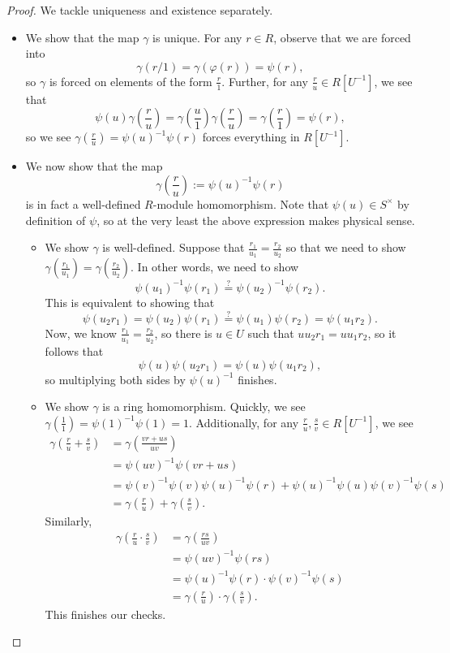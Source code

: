 \begin{proof}
	We tackle uniqueness and existence separately.
	\begin{itemize}
		\item We show that the map $\gamma$ is unique. For any $r\in R$, observe that we are forced into
		\[\gamma(r/1)=\gamma(\varphi(r))=\psi(r),\]
		so $\gamma$ is forced on elements of the form $\frac r1$. Further, for any $\frac ru\in R\left[U^{-1}\right]$, we see that
		\[\psi(u)\gamma\left(\frac ru\right)=\gamma\left(\frac u1\right)\gamma\left(\frac ru\right)=\gamma\left(\frac r1\right)=\psi(r),\]
		so we see $\gamma\left(\frac ru\right)=\psi(u)^{-1}\psi(r)$ forces everything in $R\left[U^{-1}\right]$.
		\item We now show that the map
		\[\gamma\left(\frac ru\right):=\psi(u)^{-1}\psi(r)\]
		is in fact a well-defined $R$-module homomorphism. Note that $\psi(u)\in S^\times$ by definition of $\psi$, so at the very least the above expression makes physical sense.
		\begin{itemize}
			\item We show $\gamma$ is well-defined. Suppose that $\frac{r_1}{u_1}=\frac{r_2}{u_2}$ so that we need to show $\gamma\left(\frac{r_1}{u_1}\right)=\gamma\left(\frac{r_2}{u_2}\right)$. In other words, we need to show
			\[\psi(u_1)^{-1}\psi(r_1)\stackrel?=\psi(u_2)^{-1}\psi(r_2).\]
			This is equivalent to showing that
			\[\psi(u_2r_1)=\psi(u_2)\psi(r_1)\stackrel?=\psi(u_1)\psi(r_2)=\psi(u_1r_2).\]
			Now, we know $\frac{r_1}{u_1}=\frac{r_2}{u_2}$, so there is $u\in U$ such that $uu_2r_1=uu_1r_2$, so it follows that
			\[\psi(u)\psi(u_2r_1)=\psi(u)\psi(u_1r_2),\]
			so multiplying both sides by $\psi(u)^{-1}$ finishes.
			\item We show $\gamma$ is a ring homomorphism. Quickly, we see $\gamma\left(\frac11\right)=\psi(1)^{-1}\psi(1)=1$. Additionally, for any $\frac ru,\frac sv\in R\left[U^{-1}\right]$, we see
			\begin{align*}
				\gamma\left(\frac ru+\frac sv\right) &= \gamma\left(\frac{vr+us}{uv}\right) \\
				&= \psi(uv)^{-1}\psi(vr+us) \\
				&= \psi(v)^{-1}\psi(v)\psi(u)^{-1}\psi(r)+\psi(u)^{-1}\psi(u)\psi(v)^{-1}\psi(s) \\
				&= \gamma\left(\frac ru\right)+\gamma\left(\frac sv\right).
			\end{align*}
			Similarly,
			\begin{align*}
				\gamma\left(\frac ru\cdot\frac sv\right) &= \gamma\left(\frac{rs}{uv}\right) \\
				&= \psi(uv)^{-1}\psi(rs) \\
				&= \psi(u)^{-1}\psi(r)\cdot\psi(v)^{-1}\psi(s) \\
				&= \gamma\left(\frac ru\right)\cdot\gamma\left(\frac sv\right).
			\end{align*}
			This finishes our checks.
			\qedhere
		\end{itemize}
	\end{itemize}
\end{proof}

